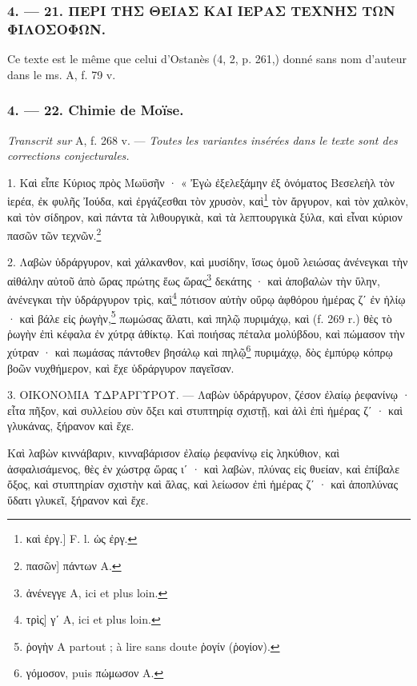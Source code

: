 \documentclass[a4paper, 11pt, oneside, polutonikogreek, french]{article}
\begin{document}
\bigskip
\centerline{\EightStarTaper}
\centerline{\EightStarTaper\EightStarTaper}
\bigskip

\subsubsection{4. --- 21. ΠΕΡΙ ΤΗΣ ΘΕΙΑΣ ΚΑΙ ΙΕΡΑΣ ΤΕΧΝΗΣ ΤΩΝ ΦΙΛΟΣΟΦΩΝ.}

Ce texte est le même que celui d'Ostanès (4, 2, p. 261,) donné sans nom d'auteur dans le ms. A, f. 79 v.

\bigskip
\centerline{\EightStarTaper}
\centerline{\EightStarTaper\EightStarTaper}
\bigskip

\subsubsection{4. --- 22. Chimie de Moïse.}

\emph{Transcrit sur} A, f. 268 v. --- \emph{Toutes les variantes insérées dans le texte sont des corrections conjecturales.}

\bigskip

1. Καὶ εἶπε Κύριος πρὸς Μωϋσῆν · « Ἐγὼ ἐξελεξάμην ἐξ ὀνόματος Βεσελεὴλ τὸν ἱερέα, ἐκ φυλῆς Ἰούδα, καὶ ἐργάζεσθαι τὸν χρυσὸν, καὶ\footnote{καὶ ἐργ.] F. l. ὡς ἐργ.} τὸν ἄργυρον, καὶ τὸν χαλκὸν, καὶ τὸν σίδηρον, καὶ πάντα τὰ λιθουργικὰ, καὶ τὰ λεπτουργικὰ ξύλα, καὶ εἶναι κύριον πασῶν τῶν τεχνῶν.\footnote{πασῶν] πάντων A.}

2. Λαβὼν ὑδράργυρον, καὶ χάλκανθον, καὶ μυσίδην, ἴσως ὁμοῦ λειώσας ἀνένεγκαι τὴν αἰθάλην αὐτοῦ ἀπὸ ὤρας πρώτης ἕως ὥρας\footnote{ἀνένεγγε A, ici et plus loin.} δεκάτης · καὶ ἀποβαλὼν τὴν ὕλην, ἀνένεγκαι τὴν ὑδράργυρον τρὶς, καὶ\footnote{τρὶς] γʹ A, ici et plus loin.} πότισον αὐτὴν οὔρῳ ἀφθόρου ἡμέρας ζʹ ἐν ἡλίῳ · καὶ βάλε εἰς ῥωγὴν,\footnote{ῥογὴν A partout ; à lire sans doute ῥογίν (ῥογίον).} πωμώσας ἅλατι, καὶ πηλῷ πυριμάχῳ, καὶ (f. 269 r.) θὲς τὸ ῥωγὴν ἐπὶ κέφαλα ἐν χύτρᾳ ἀθίκτῳ. Καὶ ποιήσας πέταλα μολύβδου, καὶ πώμασον τὴν χύτραν · καὶ πωμάσας πάντοθεν βησάλῳ καὶ πηλῷ\footnote{γόμοσον, puis πώμωσον A.} πυριμάχῳ, δὸς ἐμπύρῳ κόπρῳ βοῶν νυχθήμερον, καὶ ἔχε ὑδράργυρον παγεῖσαν.

3. ΟΙΚΟΝΟΜΙΑ ΥΔΡΑΡΓΥΡΟΥ. --- Λαβὼν ὑδράργυρον, ζέσον ἐλαίῳ ῥεφανίνῳ · εἶτα πῆξον, καὶ συλλείου σὺν ὄξει καὶ στυπτηρίᾳ σχιστῇ, καὶ ἀλὶ ἐπὶ ἡμέρας ζʹ · καὶ γλυκάνας, ξήρανον καὶ ἔχε.

Καὶ λαβὼν κιννάβαριν, κινναβάρισον ἐλαίῳ ῥεφανίνῳ εἰς ληκύθιον, καὶ ἀσφαλισάμενος, θὲς ἐν χώστρᾳ ὥρας ιʹ · καὶ λαβὼν, πλύνας εἰς θυείαν, καὶ ἐπίβαλε ὄξος, καὶ στυπτηρίαν σχιστὴν καὶ ἅλας, καὶ λείωσον ἐπὶ ἡμέρας ζʹ · καὶ ἀποπλύνας ὕδατι γλυκεῖ, ξήρανον καὶ ἔχε.
\end{document}
